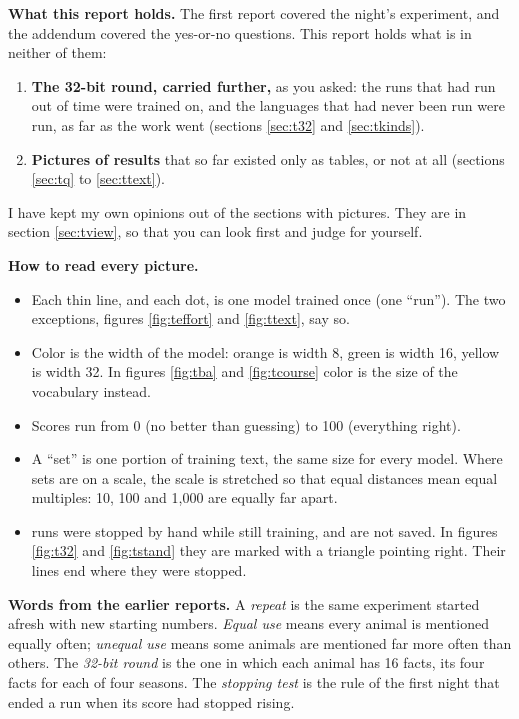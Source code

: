 \begin{keybox}
\textbf{What this report holds.} The first report covered the night's experiment, and the
addendum covered the yes-or-no questions. This report holds what is in neither of them:
\begin{enumerate}[itemsep=1pt,topsep=2pt]
\item \textbf{The 32-bit round, carried further,} as you asked: the runs that had run out of
      time were trained on, and the languages that had never been run were run, as far as the work went
      (sections \ref{sec:t32} and \ref{sec:tkinds}).
\item \textbf{Pictures of results} that so far existed only as tables, or not at all
      (sections \ref{sec:tq} to \ref{sec:ttext}).
\end{enumerate}
I have kept my own opinions out of the sections with pictures. They are in section
\ref{sec:tview}, so that you can look first and judge for yourself.

\textbf{How to read every picture.}
\begin{itemize}[itemsep=1pt,topsep=2pt]
\item Each thin line, and each dot, is one model trained once (one ``run''). The two
      exceptions, figures \ref{fig:teffort} and \ref{fig:ttext}, say so.
\item Color is the width of the model: orange is width 8, green is width 16, yellow is
      width 32. In figures \ref{fig:tba} and \ref{fig:tcourse} color is the size of the
      vocabulary instead.
\item Scores run from 0 (no better than guessing) to 100 (everything right).
\item A ``set'' is one portion of training text, the same size for every model. Where sets
      are on a scale, the scale is stretched so that equal distances mean equal multiples:
      10, 100 and 1,000 are equally far apart.
\item \stilltraining{} runs were stopped by hand while still training, and are not saved. In
      figures \ref{fig:t32} and \ref{fig:tstand} they are marked with a triangle pointing
      right. Their lines end where they were stopped.
\end{itemize}

\textbf{Words from the earlier reports.} A \emph{repeat} is the same experiment started
afresh with new starting numbers. \emph{Equal use} means every animal is mentioned equally
often; \emph{unequal use} means some animals are mentioned far more often than others. The
\emph{32-bit round} is the one in which each animal has 16 facts, its four facts for each of
four seasons. The \emph{stopping test} is the rule of the first night that ended a run when
its score had stopped rising.
\end{keybox}

